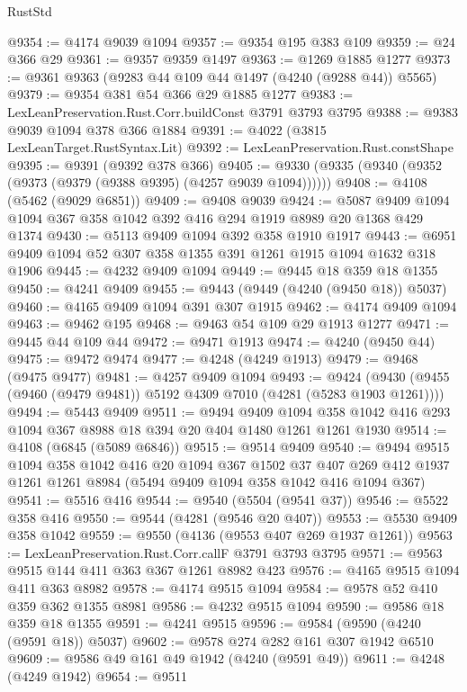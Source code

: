\begin{lexlean}{RustStd}
\begin{coremodule}
@9354 := @4174 @9039 @1094
@9357 := @9354 @195 @383 @109
@9359 := @24 @366 @29
@9361 := @9357 @9359 @1497
@9363 := @1269 @1885 @1277
@9373 := @9361 @9363 (@9283 @44 @109 @44 @1497 (@4240 (@9288 @44)) @5565)
@9379 := @9354 @381 @54 @366 @29 @1885 @1277
@9383 := LexLeanPreservation.Rust.Corr.buildConst @3791 @3793 @3795
@9388 := @9383 @9039 @1094 @378 @366 @1884
@9391 := @4022 (@3815 LexLeanTarget.RustSyntax.Lit)
@9392 := LexLeanPreservation.Rust.constShape
@9395 := @9391 (@9392 @378 @366)
@9405 := @9330 (@9335 (@9340 (@9352 (@9373 (@9379 (@9388 @9395) (@4257 @9039 @1094))))))
@9408 := @4108 (@5462 (@9029 @6851))
@9409 := @9408 @9039
@9424 := @5087 @9409 @1094 @1094 @367 @358 @1042 @392 @416 @294 @1919 @8989 @20 @1368 @429 @1374
@9430 := @5113 @9409 @1094 @392 @358 @1910 @1917
@9443 := @6951 @9409 @1094 @52 @307 @358 @1355 @391 @1261 @1915 @1094 @1632 @318 @1906
@9445 := @4232 @9409 @1094
@9449 := @9445 @18 @359 @18 @1355
@9450 := @4241 @9409
@9455 := @9443 (@9449 (@4240 (@9450 @18)) @5037)
@9460 := @4165 @9409 @1094 @391 @307 @1915
@9462 := @4174 @9409 @1094
@9463 := @9462 @195
@9468 := @9463 @54 @109 @29 @1913 @1277
@9471 := @9445 @44 @109 @44
@9472 := @9471 @1913
@9474 := @4240 (@9450 @44)
@9475 := @9472 @9474
@9477 := @4248 (@4249 @1913)
@9479 := @9468 (@9475 @9477)
@9481 := @4257 @9409 @1094
@9493 := @9424 (@9430 (@9455 (@9460 (@9479 @9481)) @5192 @4309 @7010 (@4281 (@5283 @1903 @1261))))
@9494 := @5443 @9409
@9511 := @9494
    @9409
    @1094
    @358
    @1042
    @416
    @293
    @1094
    @367
    @8988
    @18
    @394
    @20
    @404
    @1480
    @1261
    @1261
    @1930
@9514 := @4108 (@6845 (@5089 @6846))
@9515 := @9514 @9409
@9540 := @9494
    @9515
    @1094
    @358
    @1042
    @416
    @20
    @1094
    @367
    @1502
    @37
    @407
    @269
    @412
    @1937
    @1261
    @1261
    @8984
    (@5494 @9409 @1094 @358 @1042 @416 @1094 @367)
@9541 := @5516 @416
@9544 := @9540 (@5504 (@9541 @37))
@9546 := @5522 @358 @416
@9550 := @9544 (@4281 (@9546 @20 @407))
@9553 := @5530 @9409 @358 @1042
@9559 := @9550 (@4136 (@9553 @407 @269 @1937 @1261))
@9563 := LexLeanPreservation.Rust.Corr.callF @3791 @3793 @3795
@9571 := @9563 @9515 @144 @411 @363 @367 @1261 @8982 @423
@9576 := @4165 @9515 @1094 @411 @363 @8982
@9578 := @4174 @9515 @1094
@9584 := @9578 @52 @410 @359 @362 @1355 @8981
@9586 := @4232 @9515 @1094
@9590 := @9586 @18 @359 @18 @1355
@9591 := @4241 @9515
@9596 := @9584 (@9590 (@4240 (@9591 @18)) @5037)
@9602 := @9578 @274 @282 @161 @307 @1942 @6510
@9609 := @9586 @49 @161 @49 @1942 (@4240 (@9591 @49))
@9611 := @4248 (@4249 @1942)
@9654 := @9511

\end{coremodule}
\end{lexlean}
